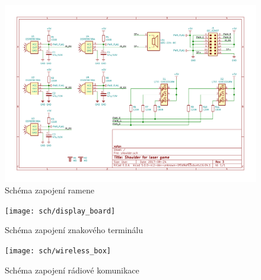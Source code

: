 \begin{landscape}
    \begin{figure}[h]
	    \centering
	    \includegraphics[height=\textwidth]{sch/shoulder}
	    \caption{Schéma zapojení ramene}
    \end{figure}
\end{landscape}

\begin{landscape}
    \begin{figure}[h]
	    \centering
	    \texttt{[image: sch/display\_board]}
	    \caption{Schéma zapojení znakového terminálu}
    \end{figure}
\end{landscape}

\begin{landscape}
    \begin{figure}[h]
	    \centering
	    \texttt{[image: sch/wireless\_box]}
	    \caption{Schéma zapojení rádiové komunikace}
    \end{figure}
\end{landscape}
